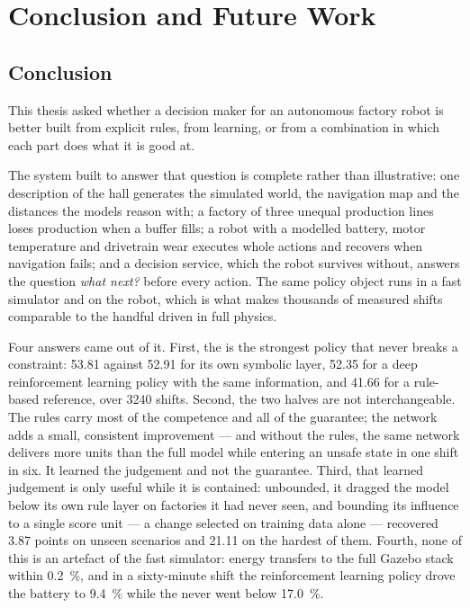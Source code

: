 \chapter{Conclusion and Future Work}
\label{ch:conclusion}

\section{Conclusion}
\label{sec:conclusion}

This thesis asked whether a decision maker for an autonomous factory robot is better built from
explicit rules, from learning, or from a combination in which each part does what it is good at.

The system built to answer that question is complete rather than illustrative: one description of
the hall generates the simulated world, the navigation map and the distances the models reason
with; a factory of three unequal production lines loses production when a buffer fills; a robot
with a modelled battery, motor temperature and drivetrain wear executes whole actions and recovers
when navigation fails; and a decision service, which the robot survives without, answers the
question \emph{what next?} before every action. The same policy object runs in a fast simulator and
on the robot, which is what makes thousands of measured shifts comparable to the handful driven in
full physics.

Four answers came out of it. First, the \NS is the strongest policy that never breaks a constraint:
\num{53.81} against \num{52.91} for its own symbolic layer, \num{52.35} for a deep reinforcement
learning policy with the same information, and \num{41.66} for a rule-based reference, over
\num{3240} shifts. Second, the two halves are not interchangeable. The rules carry most of the
competence and all of the guarantee; the network adds a small, consistent improvement --- and
without the rules, the same network delivers more units than the full model while entering an
unsafe state in one shift in six. It learned the judgement and not the guarantee. Third, that
learned judgement is only useful while it is contained: unbounded, it dragged the model below its
own rule layer on factories it had never seen, and bounding its influence to a single score unit
--- a change selected on training data alone --- recovered \num{3.87} points on unseen scenarios and
\num{21.11} on the hardest of them. Fourth, none of this is an artefact of the fast simulator:
energy transfers to the full Gazebo stack within \SI{0.2}{\percent}, and in a sixty-minute shift
the reinforcement learning policy drove the battery to \SI{9.4}{\percent} while the \NS never went
below \SI{17.0}{\percent}.

